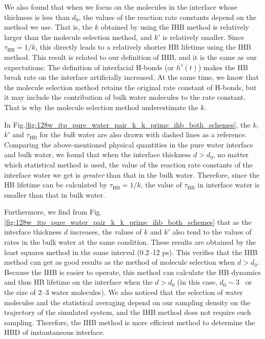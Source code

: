 {We also found that when we focus on the molecules in the interface whose thickness is less than $d_0$, 
the values of the reaction rate constants depend on the method we use. 
That is, the $k$ obtained by using the IHB method is relatively larger than the molecule selection method, and $k'$ is relatively smaller. 
Since $\tau_\text{HB} = 1/k$, this directly leads to a relatively shorter HB lifetime using the IHB method. 
This result is related to our definition of IHB, and it is the same as our expectations: The definition of interfacial H-bonds (or $h^s(t)$) makes the HB break rate 
on the interface artificially increased. At the same time, we know that the molecule selection method retains the original rate constant of H-bonds, 
but it may include the contribution of bulk water molecules to the rate constant. That is why the molecule selection method underestimate the $k$. 

In Fig.\thinspace\ref{fig:128w_itp_pure_water_pair_k_k_prime_ihb_both_schemes}, the $k$, $k'$ and $\tau_\text{HB}$ for the \emph{bulk} water 
are also drawn with dashed lines as a reference.
Comparing the above-mentioned physical quantities in the pure water interface and bulk water, we found that when the interface thickness $d>d_0$, 
no matter which statistical method is used, the value of the reaction rate constants of the interface water we get is \emph{greater} than that in the bulk water. 
Therefore, since the HB lifetime can be calculated by $\tau_\text{HB} = 1/k$, the value of $\tau_\text{HB}$ in interface water is smaller than that in bulk water.

Furthermore, we find from Fig.\thinspace\ref{fig:128w_itp_pure_water_pair_k_k_prime_ihb_both_schemes} that as the interface thickness $d$ increases, 
the values of $k$ and $k'$ also tend to the values of rates in the bulk water at the same condition.
These results are obtained by the least squares method in the same interval (0.2--12 ps). This verifies that the IHB method 
can get as good results as the method of molecule selection  when $d>d_0$. 
Because the IHB is easier to operate, this method can calculate the HB dynamics and thus HB lifetime on the interface 
when the $d>d_0$ (in this case, $d_0 \sim 3$ \A \ or the size of 2--3 water molecules).
We also noticed that the selection of water molecules and the statistical averaging depend on our sampling density on the trajectory of the simulated system, 
and the IHB method does not require such sampling. Therefore, the IHB method is more efficient method to determine the HBD of instantaneous interface.

}
